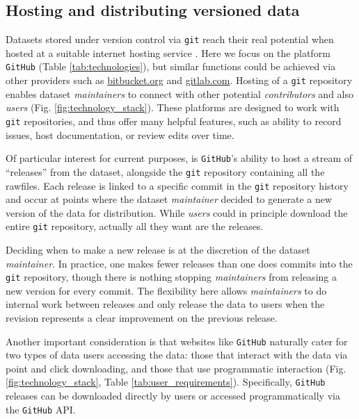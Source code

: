 \documentclass[a4paper,num-refs]{assets/oup-contemporary}
\begin{document}
\subsection{Hosting and distributing versioned data}

Datasets stored under version control via \texttt{git} reach their real potential when hosted at a suitable internet hosting service \cite{Ram-2013,Perkel-2016}. Here we focus on the platform \texttt{GitHub} (Table \ref{tab:technologies}), but similar functions could be achieved via other providers such as \href{http://bitbucket.org}{bitbucket.org} and \href{http://gitlab.com}{gitlab.com}. Hosting of a \texttt{git} repository enables dataset \emph{maintainers} to connect with other potential \emph{contributors} and also \emph{users} (Fig. \ref{fig:technology_stack}). These platforms are designed to work with \texttt{git} repositories, and thus offer many helpful features, such as ability to record issues, host documentation, or review edits over time.

Of particular interest for current purposes, is \texttt{GitHub}'s ability to host a stream of ``releases'' from the dataset, alongside the \texttt{git} repository containing all the rawfiles. Each release is linked to a specific commit in the \texttt{git} repository history and occur at points where the dataset \emph{maintainer} decided to generate a new version of the data for distribution. While \emph{users} could in principle download the entire \texttt{git} repository, actually all they want are the releases.

Deciding when to make a new release is at the discretion of the dataset \emph{maintainer}. In practice, one makes fewer releases than one does commits into the \texttt{git} repository, though there is nothing stopping \emph{maintainers} from releasing a new version for every commit. The flexibility here allows \emph{maintainers} to do internal work between releases and only release the data to users when the revision represents a clear improvement on the previous release.

Another important consideration is that websites like \texttt{GitHub} naturally cater for two types of data users accessing the data: those that interact with the data via point and click downloading, and those that use programmatic interaction (Fig. \ref{fig:technology_stack}, Table \ref{tab:user_requirements}). Specifically, \texttt{GitHub} releases can be downloaded directly by users or accessed programmatically via the \texttt{GitHub} API.
\end{document}
